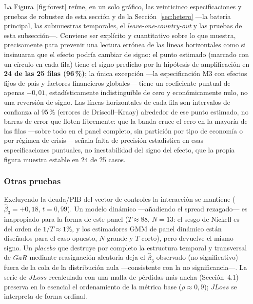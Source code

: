 La Figura~\ref{fig:forest} reúne, en un solo gráfico, las veinticinco especificaciones y pruebas de robustez de esta sección y de la Sección~\ref{sec:hetero} —la batería principal, las submuestras temporales, el \textit{leave-one-country-out} y las pruebas de esta subsección—. Conviene ser explícito y cuantitativo sobre lo que muestra, precisamente para prevenir una lectura errónea de las líneas horizontales como si insinuaran que el efecto podría cambiar de signo: el punto estimado (marcado con un círculo en cada fila) tiene el signo predicho por la hipótesis de amplificación en \textbf{24 de las 25 filas (96\,\%)}; la única excepción —la especificación M3 con efectos fijos de país y factores financieros globales— tiene un coeficiente puntual de apenas $+0{,}01$, estadísticamente indistinguible de cero y económicamente nulo, no una reversión de signo. Las líneas horizontales de cada fila son intervalos de confianza al 95\,\% (errores de Driscoll--Kraay) alrededor de ese punto estimado, no barras de error que floten libremente: que la banda cruce el cero en la mayoría de las filas —sobre todo en el panel completo, sin partición por tipo de economía o por régimen de crisis— señala falta de precisión estadística en esas especificaciones puntuales, no inestabilidad del signo del efecto, que la propia figura muestra estable en 24 de 25 casos.

\subsubsection{Otras pruebas}

Excluyendo la deuda/PIB del vector de controles la interacción se mantiene ($\hat\beta_3=+0{,}18$, $t=0{,}99$). Un modelo dinámico —añadiendo el spread rezagado— es inapropiado para la forma de este panel ($T\approx88$, $N=13$: el sesgo de Nickell es del orden de $1/T\approx1\%$, y los estimadores GMM de panel dinámico están diseñados para el caso opuesto, $N$ grande y $T$ corto), pero devuelve el mismo signo. Un \textit{placebo} que destruye por completo la estructura temporal y transversal de $GaR$ mediante reasignación aleatoria deja el $\hat\beta_3$ observado (no significativo) fuera de la cola de la distribución nula —consistente con la no significancia—. La serie de $JLoss$ recalculada con una malla de pérdidas más ancha (Sección~4.1) preserva en lo esencial el ordenamiento de la métrica base ($\rho\approx0{,}9$); $JLoss$ se interpreta de forma ordinal.

